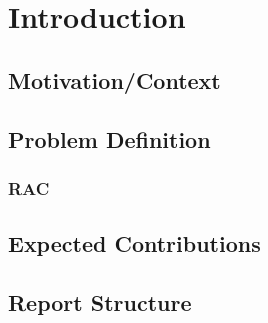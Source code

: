 
%

\chapter{Introduction}
\label{cha:introduction}

\section{Motivation/Context}
\label{sec:motivation_context}

\section{Problem Definition}
\label{sub:problem_definition}

\subsection{RAC}
\label{sub:rac}

\section{Expected Contributions}
\label{sub:expected_Contributions}

\section{Report Structure}
\label{sec:report_structure}